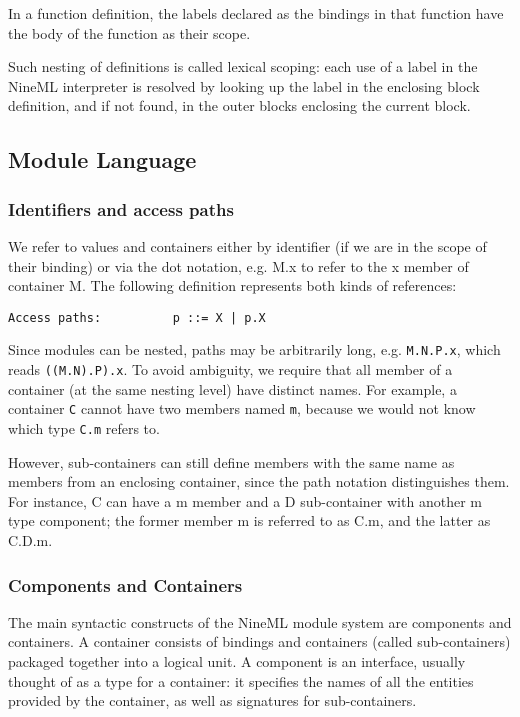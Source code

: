 \documentclass[10pt]{article}
\begin{document}
In a function definition, the labels declared as the bindings in that
function have the body of the function as their scope. 

Such nesting of definitions is called lexical scoping: each use of
a label in the NineML interpreter is resolved by looking up the label
in the enclosing block definition, and if not found, in the outer
blocks enclosing the current block. 

\subsection*{Module Language}
\subsubsection*{Identifiers and access paths}
We refer to values and containers either by identifier (if we are in
the scope of their binding) or via the dot notation, e.g. M.x to refer
to the x member of container M. The following definition represents
both kinds of references: \begin{center}
{\small{}\begin{verbatim}
Access paths:          p ::= X | p.X
\end{verbatim}
}\end{center}


Since modules can be nested, paths may be arbitrarily long,
e.g. \texttt{M.N.P.x}, which reads \texttt{((M.N).P).x}. To
avoid ambiguity, we require that all member of a container (at the
same nesting level) have distinct names. For example, a container \texttt{C} cannot have two members named \texttt{m}, because we would not know which type \texttt{C.m} refers to. 

However, sub-containers can still define members with the same name
as members from an enclosing container, since the path notation
distinguishes them. For instance, C can have a m member and a D
sub-container with another m type component; the former member m is
referred to as C.m, and the latter as C.D.m. 

\subsubsection*{Components and Containers}
The main syntactic constructs of the NineML module system are
components and containers. A container consists of bindings and
containers (called sub-containers) packaged together into a logical
unit. A component is an interface, usually thought of as a type for a
container: it specifies the names of all the entities provided by the
container, as well as signatures for sub-containers. 
\end{document}
